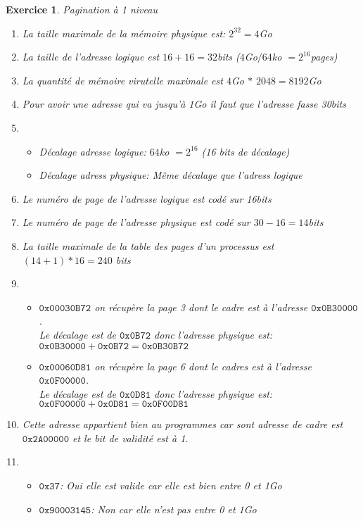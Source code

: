 \documentclass{article}
\theoremstyle{plain}
\newtheorem{exo}{Exercice}%
\begin{document}
\begin{exo} Pagination à 1 niveau
\begin{enumerate}
    \item La taille maximale de la mémoire physique est: $2^{32} = 4$Go
    \item La taille de l'adresse logique est $16 + 16 = 32$bits ($4$Go$ / 64$ko $= 2^{16}$pages)
    \item La quantité de mémoire virutelle maximale est $4$Go  $*$ $2048 = 8192$Go
    \item Pour avoir une adresse qui va jusqu'à 1Go il faut que l'adresse fasse 30bits
    \item \begin{itemize}
        \item Décalage adresse logique: $64$ko $= 2^{16}$ (16 bits de décalage) 
        \item Décalage adress physique: Même décalage que l'adress logique
    \end{itemize}
    \item Le numéro de page de l'adresse logique est codé sur 16bits
    \item Le numéro de page de l'adresse physique est codé sur $30 - 16 = 14$bits
    \item La taille maximale de la table des pages d'un processus est $(14 + 1) * 16 = 240$ bits
    \item \begin{itemize}
        \item $\mathtt{0x00030B72}$ on récupère la page 3 dont 
                le cadre est à l'adresse $\mathtt{0x0B30000}$.\\
                Le décalage est de $\mathtt{0x0B72}$ donc l'adresse physique est: 
                $\mathtt{0x0B30000} + \mathtt{0x0B72} = \mathtt{0x0B30B72}$
        \item $\mathtt{0x00060D81}$ on récupère la page 6 dont le cadres
                est à l'adresse $\mathtt{0x0F00000}$.\\
                Le décalage est de $\mathtt{0x0D81}$ donc l'adresse physique est:
                $\mathtt{0x0F00000} + \mathtt{0x0D81} = \mathtt{0x0F00D81}$
    \end{itemize}
    \item Cette adresse appartient bien au programmes car sont adresse de cadre est 
            $\mathtt{0x2A00000}$ et le bit de validité est à 1.
    \item \begin{itemize}
        \item $\mathtt{0x37}$: Oui elle est valide car elle est bien entre 0 et 1Go
        \item $\mathtt{0x90003145}$: Non car elle n'est pas entre 0 et 1Go
    \end{itemize}
\end{enumerate}
\end{exo}
\end{document}
